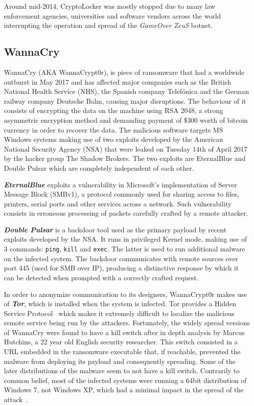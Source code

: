\documentclass[10pt,a4paper]{article}
\begin{document}
Around mid-2014, CryptoLocker was mostly stopped due to many law enforcement agencies, universities and software vendors across the world interrupting the operation and spread of the \textit{GameOver ZeuS} botnet.

\subsection{WannaCry}
WannaCry (AKA WannaCrypt0r), is piece of ransomware that had a worldwide outburst in May 2017 and has affected major companies such as the British National Health Service (NHS), the Spanish company Telefónica and the German railway company Deutsche Bahn, causing major disruptions. The behaviour of it consists of encrypting the data on the machine using RSA 2048, a strong asymmetric encryption method and demanding payment of \$300 worth of bitcoin currency in order to recover the data. The malicious software targets MS Windows systems making use of two exploits developed by the American National Security Agency (NSA) that were leaked on Tuesday 14th of April 2017 by the hacker group The Shadow Brokers. The two exploits are EternalBlue and Double Pulsar which are completely independent of each other.

\textbf{\textit{EternalBlue}} exploits a vulnerability in Microsoft's implementation of Server Message Block (SMBv1), a protocol commonly used for sharing access to files, printers, serial ports and other services across a network. Such vulnerability consists in erroneous processing of packets carefully crafted by a remote attacker.

\textbf{\textit{Double Pulsar}} is a backdoor tool used as the primary payload by recent exploits developed by the NSA. It runs in privileged Kernel mode, making use of 3 commands: \texttt{ping}, \texttt{kill} and \texttt{exec}. The latter is used to run additional malware on the infected system. The backdoor communicates with remote sources over port 445 (used for SMB over IP), producing a distinctive response by which it can be detected when prompted with a correctly crafted request.

In order to anonymize communication to its designers, WannaCrypt0r makes use of \textit{\textbf{Tor}}, which is installed when the system is infected. Tor provides a Hidden Service Protocol~\cite{torcircuits} which makes it extremely difficult to localize the malicious remote service being run by the attackers.
Fortunately, the widely spread versions of WannaCry were found to have a kill switch after in depth analysis by Marcus Hutchins, a 22 year old English security researcher. This switch consisted in a URL  embedded in the ransomware executable that, if reachable, prevented the malware from deploying its payload and consequently spreading. Some of the later distributions of the malware seem to not have a kill switch. Contrarily to common belief, most of the infected systems were running a 64bit distribution of Windows 7, not Windows XP, which had a minimal impact in the spread of the attack~\cite{wanacrySystems}.
\end{document}
